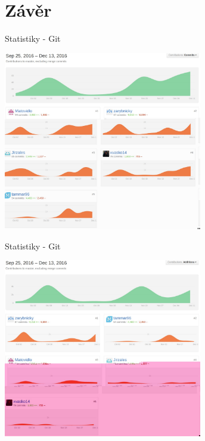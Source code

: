 \documentclass[13pt]{beamer}
\begin{document}

\section{Závěr}
\begin{frame}{Statistiky - Git}
  \begin{center}
    \includegraphics[width=0.65\textwidth]{./img/git_commit.pdf}
  \end{center}
\end{frame}

\begin{frame}{Statistiky - Git}
  \begin{center}
    \includegraphics[width=0.65\textwidth]{./img/git_additions.pdf}
  \end{center}
\end{frame}
\end{document}
